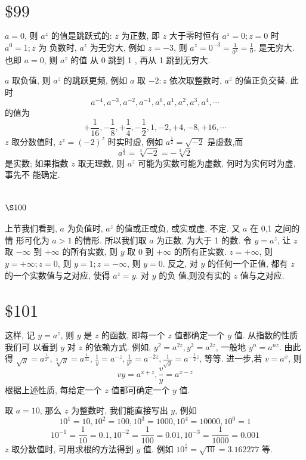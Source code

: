\section{$\$ 99$}

$a=0$, 则 $a^{z}$ 的值是跳跃式的: $z$ 为正数, 即 $z$ 大于零时恒有 $a^{z}=0 ; z=0$ 时 $a^{0}=1 ; z$ 为 负数时, $a^{z}$ 为无穷大, 例如 $z=-3$, 则 $a^{z}=0^{-3}=\frac{1}{0^{3}}=\frac{1}{0}$, 是无穷大. 也即 $a=0$, 则 $a^{z}$ 的值 从 0 跳到 1 , 再从 1 跳到无穷大.

$a$ 取负值, 则 $a^{z}$ 的跳跃更频, 例如 $a$ 取 $-2: z$ 依次取整数时, $a^{z}$ 的值正负交替. 此时
\[
a^{-4}, a^{-3}, a^{-2}, a^{-1}, a^{0}, a^{1}, a^{2}, a^{3}, a^{4}, \cdots
\]
的值为
\[
+\frac{1}{16},-\frac{1}{8},+\frac{1}{4},-\frac{1}{2}, 1,-2,+4,-8,+16, \cdots
\]
$z$ 取分数值时, $z^{z}=(-2)^{z}$ 时实时虚, 例如 $a^{\frac{1}{2}}=\sqrt{-2}$ 是虚数,而
\[
a^{\frac{1}{3}}=\sqrt[3]{-2}=-\sqrt[3]{2}
\]
是实数; 如果指数 $z$ 取无理数, 则 $a^{z}$ 可能为实数可能为虚数, 何时为实何时为虚, 事先不 能确定.

\section{$\S 100$}

上节我们看到, $a$ 为负值时, $a^{z}$ 的值或正或负, 或实或虚, 不定. 又 $a$ 在 0,1 之间的情 形可化为 $a>1$ 的情形. 所以我们取 $a$ 为正数, 为大于 1 的数. 令 $y=a^{z}$, 让 $z$ 取 $-\infty$ 到 $+\infty$ 的所有实数, 则 $y$ 取 0 到 $+\infty$ 的所有正实数. $z=+\infty$, 则 $y=+\infty ; z=0$, 则 $y=1 ; z=-\infty$, 则 $y=0$. 反之, 对 $y$ 的任何一个正值, 都有 $z$ 的一个实数值与之对应, 使得 $a^{z}=y$. 对 $y$ 的负 值,则没有实的 $z$ 值与之对应.

\section{$\$ 101$}

这样, 记 $y=a^{z}$, 则 $y$ 是 $z$ 的函数, 即每一个 $z$ 值都确定一个 $y$ 值. 从指数的性质我们可 以看到 $y$ 对 $z$ 的依赖方式. 例如, $y^{2}=a^{2 z}, y^{3}=a^{3 z}$, 一般地 $y^{n}=a^{n z}$. 由此得 $\sqrt{y}=a^{\frac{1}{2^{z}}}, \sqrt[3]{y}=a^{\frac{1}{3 z}}$, $\frac{1}{y}=a^{-z}, \frac{1}{y^{2}}=a^{-2 z}, \frac{1}{\sqrt{y}}=a^{-\frac{1}{2} z}$, 等等. 进一步,若 $v=a^{x}$, 则
\[
v y=a^{x+z}, \frac{v}{y}=a^{x-z}
\]
根据上述性质, 每给定一个 $z$ 值都可确定一个 $y$ 值.

取 $a=10$, 那么 $z$ 为整数时, 我们能直接写出 $y$, 例如
\[
10^{1}=10,10^{2}=100,10^{3}=1000,10^{4}=10000,10^{0}=1
\]
\[
10^{-1}=\frac{1}{10}=0.1,10^{-2}=\frac{1}{100}=0.01,10^{-3}=\frac{1}{1000}=0.001
\]
$z$ 取分数值时, 可用求根的方法得到 $y$ 值. 例如 $10^{\frac{1}{2}}=\sqrt{10}=3.162277$ 等.

